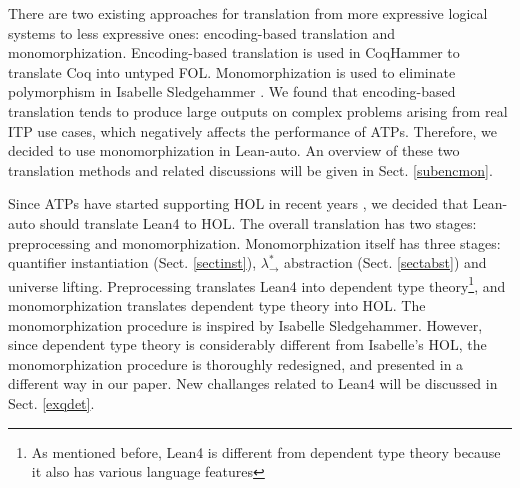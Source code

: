   There are two existing approaches for translation from more expressive
  logical systems to less expressive ones: encoding-based translation and monomorphization.
  Encoding-based translation is used in CoqHammer \cite{Czajka2018HammerFC}
  to translate Coq into untyped FOL. Monomorphization is used to
  eliminate polymorphism in Isabelle Sledgehammer \cite{Blanchette2016HammeringTQ,MonoPaper,Paulson2012ThreeYO}.
  We found that encoding-based translation tends to produce large outputs
  on complex problems arising from real ITP use cases, which negatively affects the performance of ATPs.
  Therefore, we decided to use monomorphization in Lean-auto. An overview of these two
  translation methods and related discussions will be given in Sect. \ref{subencmon}.

  Since ATPs have started supporting HOL in recent years \cite{HOVampire,ZipperpositionMakeWork,HOEProver},
  we decided that Lean-auto should translate Lean4 to HOL. The overall translation has
  two stages: preprocessing %
  and monomorphization.
  Monomorphization itself has three stages: quantifier instantiation (Sect. \ref{sectinst}),
  $\lambda_\to^*$ abstraction (Sect. \ref{sectabst}) and universe lifting. Preprocessing translates Lean4
  into dependent type theory\footnote{As mentioned before, Lean4 is different from
  dependent type theory because it also has various language features},
  and monomorphization translates dependent type theory into HOL.
  The monomorphization procedure is inspired by Isabelle Sledgehammer.
  However, since dependent type theory is considerably different from
  Isabelle's HOL, the monomorphization procedure is thoroughly redesigned,
  and presented in a different way in our paper. New challanges related to
  Lean4 will be discussed in Sect. \ref{exqdet}.